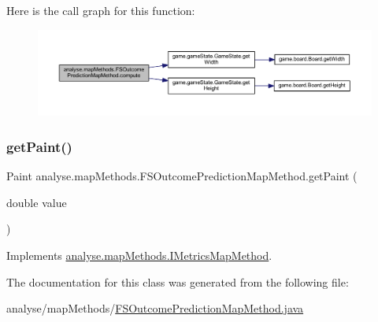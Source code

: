 Here is the call graph for this function\+:
\nopagebreak
\begin{figure}[H]
\begin{center}
\leavevmode
\includegraphics[width=350pt]{classanalyse_1_1map_methods_1_1_f_s_outcome_prediction_map_method_af2f0988760eea49a665a0eeb3db9b591_cgraph}
\end{center}
\end{figure}
\mbox{\label{classanalyse_1_1map_methods_1_1_f_s_outcome_prediction_map_method_a6525a9b7d2475e2d46fb54924a5b5994}} 
\subsubsection{\texorpdfstring{get\+Paint()}{getPaint()}}
{\footnotesize\ttfamily Paint analyse.\+map\+Methods.\+F\+S\+Outcome\+Prediction\+Map\+Method.\+get\+Paint (\begin{DoxyParamCaption}\item[{double}]{value }\end{DoxyParamCaption})\hspace{0.3cm}{\ttfamily [inline]}}



Implements \mbox{\hyperlink{interfaceanalyse_1_1map_methods_1_1_i_metrics_map_method_a102909023c32cebe3bc75052f55b24a0}{analyse.\+map\+Methods.\+I\+Metrics\+Map\+Method}}.



The documentation for this class was generated from the following file\+:\begin{DoxyCompactItemize}
\item 
analyse/map\+Methods/\mbox{\hyperlink{_f_s_outcome_prediction_map_method_8java}{F\+S\+Outcome\+Prediction\+Map\+Method.\+java}}\end{DoxyCompactItemize}
